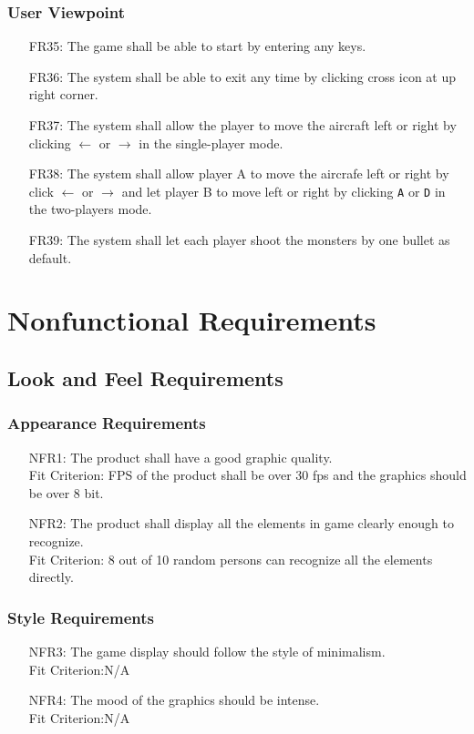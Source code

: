 \documentclass[12pt]{article}
\begin{document}
\subsubsection{User Viewpoint}
\begin{enumerate}
\item [FR35:]The game shall be able to start by entering any keys.
\item [FR36:]The system shall be able to exit any time by clicking cross icon at up right corner.
\item [FR37:]The system shall allow the player to move the aircraft left or right by clicking $\leftarrow$ or $\rightarrow$ in 
the single-player mode.
\item[FR38:] The system shall allow player A to move the aircrafe left or right by click $\leftarrow$ or $\rightarrow$ and let player B
to move left or right by clicking \verb|A| or
\verb|D| in the two-players mode.
\item [FR39:]The system shall let each player shoot the monsters by one bullet as default.
\end{enumerate}
\section{Nonfunctional Requirements}
\subsection{Look and Feel Requirements}
\subsubsection{Appearance Requirements}
\begin{itemize}
\item[NFR1:] The product shall have a good graphic quality.\\
Fit Criterion: FPS of the product shall be over 30 fps and the graphics should be over 8 bit.
\item[NFR2:] The product shall display all the elements in game clearly enough to recognize.\\
Fit Criterion: 8 out of 10 random persons can recognize all the elements directly.
\end{itemize}
\subsubsection{Style Requirements}
\begin{itemize}
\item[NFR3:] The game display should follow the style of minimalism.\\ Fit Criterion:N/A 
\item[NFR4:] The mood of the graphics should be intense.\\Fit Criterion:N/A
\end{itemize}
\end{document}
